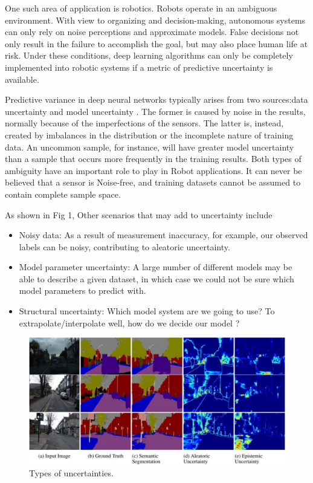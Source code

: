 \documentclass[journal]{IEEEtran}
\begin{document}
One such area of application is robotics. Robots operate in an ambiguous environment. With view to organizing and decision-making, autonomous systems can only rely on noise perceptions and approximate models.
False decisions not only result in the failure to accomplish
the goal, but may also place human life at risk. Under these conditions, deep learning algorithms can only be completely implemented into robotic systems if a metric of predictive uncertainty is available.

Predictive variance in deep neural networks typically arises from two sources:data uncertainty and model uncertainty \cite{kabir2018neural}. The former is caused by noise in the results, normally because of the imperfections of the sensors. The latter is, instead, created by imbalances in the distribution or the incomplete nature of training data.
An uncommon sample, for instance, will have greater model uncertainty than a sample that occurs more frequently in the training results.
 Both types of ambiguity have an important role to play in Robot
 applications.
 It can never be believed that a sensor is Noise-free, and training datasets cannot be assumed to contain complete sample space.

As shown in Fig 1, Other scenarios that may
add to uncertainty include 
\begin{itemize}
    \item Noisy data: As a result of measurement inaccuracy, for example,
our observed labels can be noisy, contributing to aleatoric uncertainty. 
    \item Model parameter uncertainty: A large number of different models may be able to describe a
given dataset, in which case we could not be sure which model parameters to predict with. 
    \item Structural uncertainty: Which model system
are we going to use?
To extrapolate/interpolate well, how
do we decide our model \cite{kabir2018neural}? 
\end{itemize}

\begin{figure}
    \includegraphics[scale=0.7]{figures/types_of_uncertainities.JPG}
    \caption{Types of uncertainties. \cite{kendall2019geometry}}
\end{figure}
\end{document}
